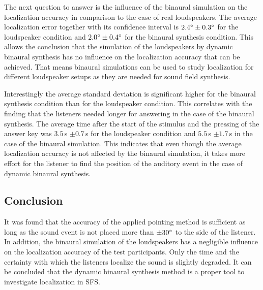 The next question to answer is the influence of the binaural simulation on the
localization accuracy in comparison to the case of real loudspeakers. The
average localization error together with its confidence interval is $2.4^\circ
\pm 0.3^\circ$ for the loudspeaker condition and $2.0^\circ \pm 0.4^\circ$
for the binaural synthesis condition. This allows the conclusion that the
simulation of the loudspeakers by dynamic binaural synthesis has no influence on
the localization accuracy that can be achieved. That means binaural
simulations can be used to study localization for different loudspeaker setups
as they are needed for sound field synthesis.

Interestingly the average standard deviation is significant higher for
the binaural synthesis condition than for the loudspeaker condition. This
correlates with the finding that the listeners needed longer for answering in the case
of the binaural synthesis. The average time after the start of the stimulus and
the pressing of the answer key was $3.5$\,s $\pm 0.7$\,s for the loudspeaker
condition and $5.5$\,s $\pm 1.7$\,s in the case of the binaural simulation.
This indicates that even though the average localization accuracy is not affected by
the binaural simulation, it takes more effort for the listener to find the
position of the auditory event in the case of dynamic binaural synthesis.

\subsection{Conclusion}
%
It was found that the accuracy of the applied pointing method is
sufficient as long as the sound event is not placed more than $\pm 30^\circ$ to the
side of the listener. In addition, the binaural simulation of the loudspeakers
has a negligible influence on the localization accuracy of the test
participants. Only the time
and the certainty with which the listeners localize the sound is slightly
degraded.
It can be concluded that the dynamic binaural synthesis method is a proper tool
to investigate localization in \ac{SFS}.

\newpage

